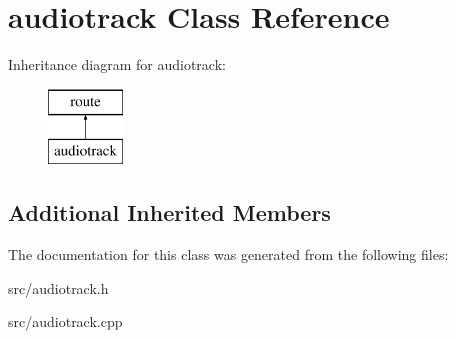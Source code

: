 \hypertarget{classaudiotrack}{}\section{audiotrack Class Reference}
\label{classaudiotrack}
Inheritance diagram for audiotrack\+:\begin{figure}[H]
\begin{center}
\leavevmode
\includegraphics[height=2.000000cm]{classaudiotrack}
\end{center}
\end{figure}
\subsection*{Additional Inherited Members}


The documentation for this class was generated from the following files\+:\begin{DoxyCompactItemize}
\item 
src/audiotrack.\+h\item 
src/audiotrack.\+cpp\end{DoxyCompactItemize}
